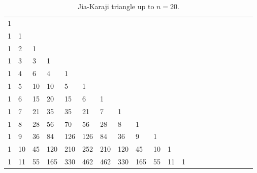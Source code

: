 \documentclass[12pt]{article}
\begin{document}
\begin{landscape}
		\begin{table}[htbp]
            \caption{Jia-Karaji triangle up to $n=20$.}
			\setlength{\tabcolsep}{4.5pt}
			\def\arraystretch{1.2}
		\small
		\begin{tabular}{lllllllllllllllllllll}
		1 &    &     &      &      &       &       &       &        &        &        &        &        &       &       &       &      &      &     &    &   \\
		1 & 1  &     &      &      &       &       &       &        &        &        &        &        &       &       &       &      &      &     &    &   \\
		1 & 2  & 1   &      &      &       &       &       &        &        &        &        &        &       &       &       &      &      &     &    &   \\
		1 & 3  & 3   & 1    &      &       &       &       &        &        &        &        &        &       &       &       &      &      &     &    &   \\
		1 & 4  & 6   & 4    & 1    &       &       &       &        &        &        &        &        &       &       &       &      &      &     &    &   \\
		1 & 5  & 10  & 10   & 5    & 1     &       &       &        &        &        &        &        &       &       &       &      &      &     &    &   \\
		1 & 6  & 15  & 20   & 15   & 6     & 1     &       &        &        &        &        &        &       &       &       &      &      &     &    &   \\
		1 & 7  & 21  & 35   & 35   & 21    & 7     & 1     &        &        &        &        &        &       &       &       &      &      &     &    &   \\
		1 & 8  & 28  & 56   & 70   & 56    & 28    & 8     & 1      &        &        &        &        &       &       &       &      &      &     &    &   \\
		1 & 9  & 36  & 84   & 126  & 126   & 84    & 36    & 9      & 1      &        &        &        &       &       &       &      &      &     &    &   \\
		1 & 10 & 45  & 120  & 210  & 252   & 210   & 120   & 45     & 10     & 1      &        &        &       &       &       &      &      &     &    &   \\
		1 & 11 & 55  & 165  & 330  & 462   & 462   & 330   & 165    & 55     & 11     & 1      &        &       &       &       &      &      &     &    &   \\

\end{tabular}
\end{table}
\end{landscape}
\end{document}
